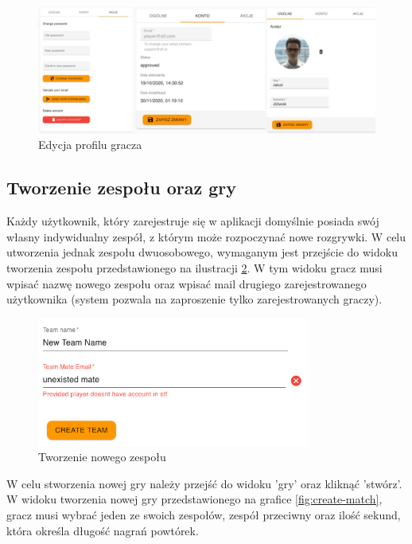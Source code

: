 \begin{figure}[h!]
  \centering
    \includegraphics[width=\textwidth]{images/player/userProfie.jpeg}
  \caption{Edycja profilu gracza}
  \label{fig:userProfile}
\end{figure}

\subsection{Tworzenie zespołu oraz gry}

Każdy użytkownik, który zarejestruje się w aplikacji domyślnie posiada swój własny indywidualny zespół, z którym może rozpoczynać nowe rozgrywki. W celu utworzenia jednak zespołu dwuosobowego, wymaganym jest przejście do widoku tworzenia zespołu przedstawionego na ilustracji \ref{fig:creating-team}. W tym widoku gracz musi wpisać nazwę nowego zespołu oraz wpisać mail drugiego zarejestrowanego użytkownika (system pozwala na zaproszenie tylko zarejestrowanych graczy).

\begin{figure}[h!]
  \centering
    \includegraphics[width=0.8\textwidth]{images/player/creating-team.png}
  \caption{Tworzenie nowego zespołu}
  \label{fig:creating-team}
\end{figure}

W celu stworzenia nowej gry należy przejść do widoku 'gry' oraz kliknąć 'stwórz'. W widoku tworzenia nowej gry przedstawionego na grafice \ref{fig:create-match}, gracz musi wybrać jeden ze swoich zespołów, zespół przeciwny oraz ilość sekund, która określa długość nagrań powtórek.

